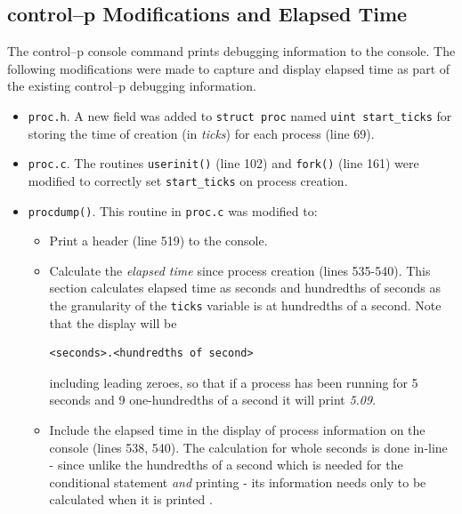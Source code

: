 \documentclass[11pt,letterpaper]{report}
\begin{document}
	\subsection*{control--p Modifications and Elapsed Time}
	The control--p console command prints debugging information to the console. The following modifications were made to capture and display elapsed time as part of the existing control--p debugging information.
	
	\begin{itemize}
	\item {\tt proc.h}. A new field was added to {\tt struct proc} named {\tt uint start\_ticks} for storing the time of creation (in \emph{ticks}) for each process (line 69). 

	\item {\tt proc.c}. The routines {\tt userinit()} (line 102) and {\tt fork()} (line 161) were modified to correctly set  {\tt start\_ticks} on process creation.
	
	\item {\tt procdump()}. This routine in {\tt proc.c} was modified to:
	
	\begin{itemize}
	
	\item Print a header (line 519) to the console.
	
	\item Calculate the \emph{elapsed time} since process creation (lines 535-540). This section calculates elapsed time as seconds and hundredths of seconds as the granularity of the {\tt ticks} variable is at hundredths of a second. Note that the display will be \begin{verbatim}<seconds>.<hundredths of second>\end{verbatim} including leading zeroes, so that if a process has been running for 5 seconds and 9 one-hundredths of a second it will print \emph{5.09}.
	
	\item Include the elapsed time in the display of process information on the console (lines 538, 540). The calculation for whole seconds is done in-line - since unlike the hundredths of a second which is needed for the conditional statement \emph{and} printing - its information needs only to be calculated when it is printed  .
	
	\end{itemize}
	
	\end{itemize}
	
\end{document}
